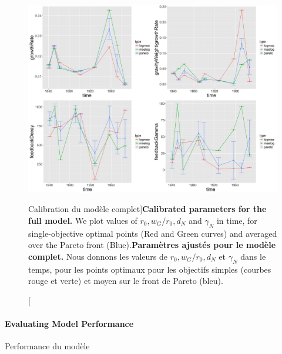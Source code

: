 \begin{figure}
\includegraphics[width=\linewidth]{Figures/Final/4-3-2-fig-interactiongibrat-feedback}
\caption[Full model calibration][Calibration du modèle complet]{\textbf{Calibrated parameters for the full model.} We plot values of $r_0, w_G/r_0, d_N$ and $\gamma_N$ in time, for single-objective optimal points (Red and Green curves) and averaged over the Pareto front (Blue).\label{fig:interactiongibrat:feedback}}{\textbf{Paramètres ajustés pour le modèle complet.} Nous donnons les valeurs de $r_0, w_G/r_0, d_N$ et $\gamma_N$ dans le temps, pour les points optimaux pour les objectifs simples (courbes rouge et verte) et moyen sur le front de Pareto (bleu).\label{fig:interactiongibrat:feedback}}
\end{figure}







\paragraph{Evaluating Model Performance}{Performance du modèle}


